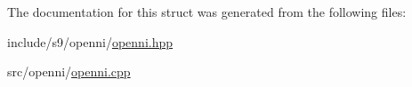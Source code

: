 The documentation for this struct was generated from the following files\-:\begin{DoxyCompactItemize}
\item 
include/s9/openni/\hyperlink{openni_8hpp}{openni.\-hpp}\item 
src/openni/\hyperlink{openni_8cpp}{openni.\-cpp}\end{DoxyCompactItemize}
